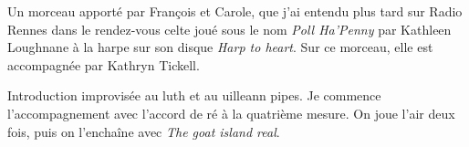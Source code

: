 Un morceau apporté par François et Carole, que j'ai entendu plus tard
sur Radio Rennes dans le rendez-vous celte joué sous le nom \emph{Poll
Ha'Penny} par Kathleen Loughnane à la harpe sur son disque \emph{Harp to
heart}. Sur ce morceau, elle est accompagnée par Kathryn Tickell.

Introduction improvisée au luth et au uilleann pipes. Je commence
l'accompagnement avec l'accord de ré à la quatrième mesure. On joue l'air deux
fois, puis on l'enchaîne avec \emph{The goat island real}.


\tune
